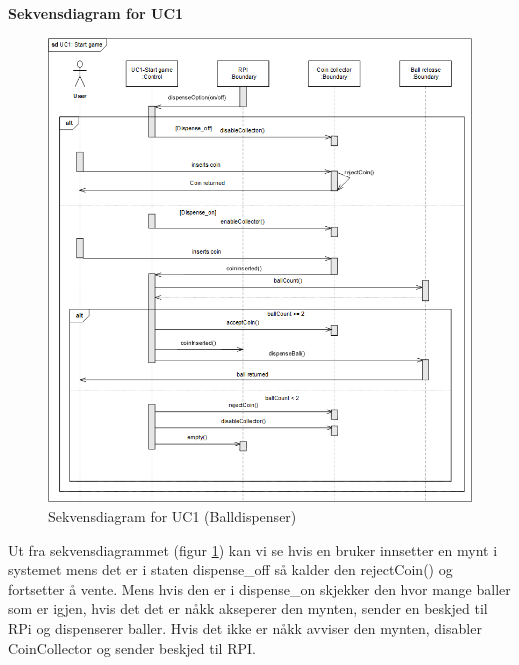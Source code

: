 \documentclass[Rapport/Rapport_main.tex]{subfiles}
\begin{document}
\textbf{Sekvensdiagram for UC1}\\
\begin{figure}[H]
    \centering
    \includegraphics[width=\textwidth]{Arkitektur/Softwarearkitektur/Applikationsmodel/BallDispenser/graphicsBallDispenser/sdUC1.png}
    \caption{Sekvensdiagram for UC1 (Balldispenser)}
    \label{fig:BallDispScUC1}
\end{figure}

Ut fra sekvensdiagrammet (figur \ref{fig:BallDispScUC1}) kan vi se hvis en bruker innsetter en mynt i systemet mens det er i staten dispense\_off så kalder den rejectCoin() og fortsetter å vente. Mens hvis den er i dispense\_on skjekker den hvor mange baller som er igjen, hvis det det er nåkk akseperer den mynten, sender en beskjed til RPi og dispenserer baller. Hvis det ikke er nåkk avviser den mynten, disabler CoinCollector og sender beskjed til RPI.\\\\
\end{document}
